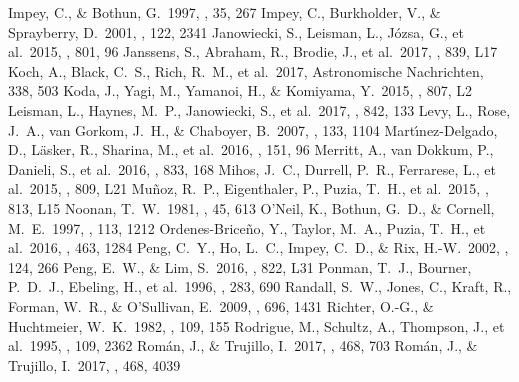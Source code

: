 \documentclass[twocolumn,trackchanges]{aastex61}
\begin{document}
\begin{thebibliography}{a}
 Impey, C., \& Bothun, G.\ 1997, \araa, 35, 267
 Impey, C., Burkholder, V., \& Sprayberry, D.\ 2001, \aj, 122, 2341
 Janowiecki, S., Leisman, L., J{\'o}zsa, G., et al.\ 2015, \apj, 801, 96 
 Janssens, S., Abraham, R., Brodie, J., et al.\ 2017, \apjl, 839, L17 
 Koch, A., Black, C.~S., Rich, R.~M., et al.\ 2017, Astronomische Nachrichten, 338, 503 
 Koda, J., Yagi, M., Yamanoi, H., \& Komiyama, Y.\ 2015, \apjl, 807, L2
 Leisman, L., Haynes, M.~P., Janowiecki, S., et al.\ 2017, \apj, 842, 133 
 Levy, L., Rose, J.~A., van Gorkom, J.~H., \& Chaboyer, B.\ 2007, \aj, 133, 1104 
 Mart{\'{\i}}nez-Delgado, D., L{\"a}sker, R., Sharina, M., et al.\ 2016, \aj, 151, 96
 Merritt, A., van Dokkum, P., Danieli, S., et al.\ 2016, \apj, 833, 168 
 Mihos, J.~C., Durrell, P.~R., Ferrarese, L., et al.\ 2015, \apjl, 809, L21 
 Mu{\~n}oz, R.~P., Eigenthaler, P., Puzia, T.~H., et al.\ 2015, \apjl, 813, L15 
 Noonan, T.~W.\ 1981, \apjs, 45, 613 
 O'Neil, K., Bothun, G.~D., \& Cornell, M.~E.\ 1997, \aj, 113, 1212 
 Ordenes-Brice{\~n}o, Y., Taylor, M.~A., Puzia, T.~H., et al.\ 2016, \mnras, 463, 1284 
 Peng, C.~Y., Ho, L.~C., Impey, C.~D., \& Rix, H.-W.\ 2002, \aj, 124, 266 
 Peng, E.~W., \& Lim, S.\ 2016, \apjl, 822, L31 
 Ponman, T.~J., Bourner, P.~D.~J., Ebeling, H., et al.\ 1996, \mnras, 283, 690 
 Randall, S.~W., Jones, C., Kraft, R., Forman, W.~R., \& O'Sullivan, E.\ 2009, \apj, 696, 1431 
 Richter, O.-G., \& Huchtmeier, W.~K.\ 1982, \aap, 109, 155 
 Rodrigue, M., Schultz, A., Thompson, J., et al.\ 1995, \aj, 109, 2362 
 Rom{\'a}n, J., \& Trujillo, I.\ 2017, \mnras, 468, 703 
 Rom{\'a}n, J., \& Trujillo, I.\ 2017, \mnras, 468, 4039 

\end{thebibliography}
\end{document}
